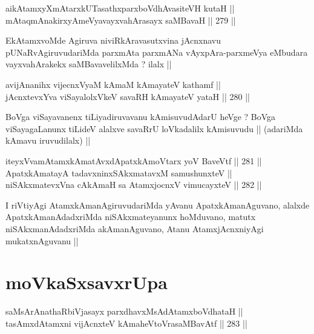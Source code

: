 
\begin{shl}
aikAtamxyXmAtarxkUTasathxparxboVdhAvasiteVH kutaH || \\
mAtaqmAnakirxyAmeVyavayxvahArasayx saMBavaH ||  279 ||  
\end{shl}

\begin{artha}
EkAtamxvoMde Agiruva niviRkAravasutxvina jAcnxnavu
pUNaRvAgiruvudariMda parxmAta parxmANa vAyxpAra-parxmeVya eMbudara
vayxvahArakekx saMBavavelilxMda ? ilalx ||
\end{artha}


\begin{shl}
avijAnanihx vijecnxVyaM kAmaM kAmayateV kathamf || \\
jAcnxtevxYva viSayalolxVkeV savaRH kAmayateV yataH ||  280 ||  
\end{shl}

\begin{artha}
BoVga viSayavanenx tiLiyadiruvavanu kAmisuvudAdarU heVge ? BoVga
viSayagaLanunx tiLideV alalxve savaRrU loVkadalilx kAmisuvudu ||
(adariMda kAmavu iruvudilalx) ||
\end{artha}

\begin{shl}
iteyxVvamAtamxkAmatAvxdApatxkAmoV\s tarx yoV BaveVtf ||  281 ||  \\
ApatxkAmatayA tadavxninxSAkxmatavxM samushunxteV || \\
niSAkxmatevxVna cAkAmaH sa AtamxjocnxV vimucayxteV ||  282 ||  
\end{shl}

\begin{artha}
I riVtiyAgi AtamxkAmanAgiruvudariMda yAvanu ApatxkAmanAguvano, alalxde
ApatxkAmanAdadxriMda niSAkxmateyanunx hoMduvano, matutx
niSAkxmanAdadxriMda akAmanAguvano, Atanu AtamxjAcnxniyAgi
mukatxnAguvanu ||
\end{artha}


\section*{moVkaSxsavxrUpa}

\begin{shl}
saMsArAnathaRbiVjasayx parxdhavxMsAdAtamxboVdhataH || \\
tasAmxdAtamxni vijAcnxteV kAmaheVtoVrasaMBavAtf ||  283 ||  
\end{shl}
				
